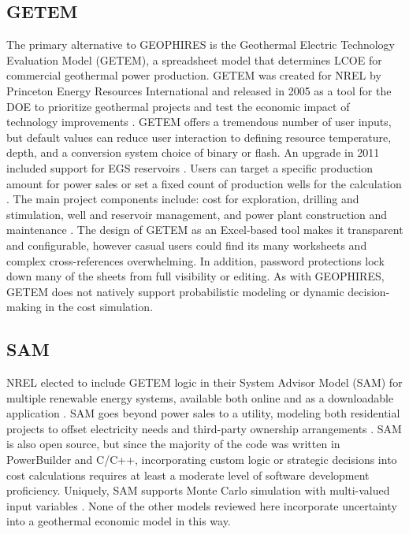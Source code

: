 \subsection{GETEM}\label{ch2:getem}
The primary alternative to GEOPHIRES is the Geothermal Electric Technology Evaluation Model (GETEM), a spreadsheet model that determines LCOE for commercial geothermal power production. GETEM was created for NREL by Princeton Energy Resources International and released in 2005 as a tool for the DOE to prioritize geothermal projects and test the economic impact of technology improvements \citep{entingh_volume_2006}. GETEM offers a tremendous number of user inputs, but default values can reduce user interaction to defining resource temperature, depth, and a conversion system choice of binary or flash. An upgrade in 2011 included support for EGS reservoirs \citep{eere_getem_2012}. Users can target a specific production amount for power sales or set a fixed count of production wells for the calculation \citep{mines_geothermal_2008}. The main project components include: cost for exploration, drilling and stimulation, well and reservoir management, and power plant construction and maintenance \citep{entingh_volume_2006}. The design of GETEM as an Excel-based tool makes it transparent and configurable, however casual users could find its many worksheets and complex cross-references overwhelming. In addition, password protections lock down many of the sheets from full visibility or editing. As with GEOPHIRES, GETEM does not natively support probabilistic modeling or dynamic decision-making in the cost simulation.

\subsection{SAM}\label{ch2:sam}
NREL elected to include GETEM logic in their System Advisor Model (SAM) for multiple renewable energy systems, available both online and as a downloadable application \citep{nrel_system_2021}. SAM goes beyond power sales to a utility, modeling both residential projects to offset electricity needs and third-party ownership arrangements \citep{blair_system_2018}. SAM is also open source, but since the majority of the code was written in PowerBuilder and C/C++, incorporating custom logic or strategic decisions into cost calculations requires at least a moderate level of software development proficiency. Uniquely, SAM supports Monte Carlo simulation with multi-valued input variables \citep{blair_system_2018}. None of the other models reviewed here incorporate uncertainty into a geothermal economic model in this way.

